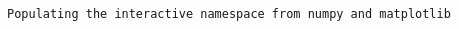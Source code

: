 \par\vspace{1\smallerfontscale}%
    \begin{addmargin}[\cellleftmargin]{0em}%
    {\smaller%
    \vspace{-1\smallerfontscale}%
    
    \begin{Verbatim}[commandchars=\\\{\}]
Populating the interactive namespace from numpy and matplotlib
    \end{Verbatim}
}%
    \end{addmargin}%
    \begin{addmargin}[\cellleftmargin]{0em}%
    {\smaller%
    \vspace{-1\smallerfontscale}%
    
    \begin{center}
    \end{center}
    { \hspace*{\fill} \\}
    }%
    \end{addmargin}%
    \begin{addmargin}[\cellleftmargin]{0em}%
    {\smaller%
    \vspace{-1\smallerfontscale}%
    
    \begin{center}
    \end{center}
    { \hspace*{\fill} \\}
    }%
    \end{addmargin}%

